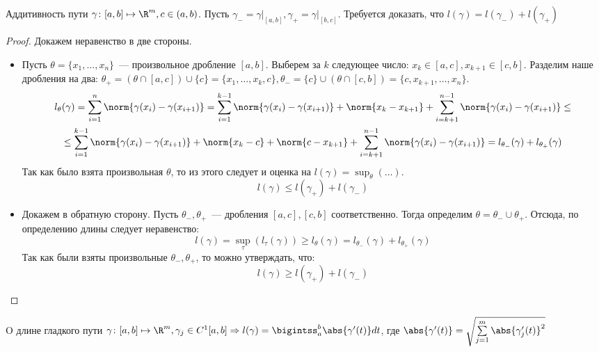 \begin{namedtheorem}{Аддитивность пути}
    $\gamma\colon [a,b]\mapsto\R^m, c\in(a,b)$.
    Пусть $\gamma_{-}=\gamma\big|_{[a,b]}, \gamma_{+} = \gamma\big|_{[b,c]}$.
    Требуется доказать, что $l(\gamma)=l(\gamma_-) + l(\gamma_+)$
\end{namedtheorem}
\begin{proof}
    Докажем неравенство в две стороны.
    \begin{itemize}
        \item
        Пусть $\theta = \{x_1,\dots, x_n\}$~--- произвольное дробление $[a,b]$.
        Выберем за $k$ следующее число: $x_k \in [a,c], x_{k + 1}\in [c,b]$.
        Разделим наше дробления на два:
        $\theta_+ = (\theta \cap [a,c]) \cup \{c\} = \{x_1,\dots,x_k, c\},
        \theta_- = \{c\} \cup (\theta \cap [c, b]) = \{c, x_{k+1},\dots, x_n\}$.
        \[
            \begin{gathered}
                l_{\theta}(\gamma) =
                \sum\limits_{i=1}^{n}\norm{\gamma(x_i) - \gamma(x_{i + 1})}=
                \sum\limits_{i=1}^{k-1}\norm{\gamma(x_i) - \gamma(x_{i + 1})} + \norm{x_k - x_{k+1}} +
                \sum\limits_{i=k+1}^{n-1}\norm{\gamma(x_i) - \gamma(x_{i + 1})}\le\\
                \le\sum\limits_{i=1}^{k-1}\norm{\gamma(x_i) - \gamma(x_{i + 1})}
                + \norm{x_k - c} + \norm{c - x_{k + 1}} +
                \sum\limits_{i=k+1}^{n-1}\norm{\gamma(x_i) - \gamma(x_{i + 1})}=
                l_{\theta_-}(\gamma) + l_{\theta_+}(\gamma)
            \end{gathered}
        \] 
        Так как было взята произвольная $\theta$, то из этого следует и оценка на $l(\gamma) = \sup_\theta(\dots)$.
        \[
            l(\gamma) \le l(\gamma_+) + l(\gamma_-)
        \] 
        \item
        Докажем в обратную сторону.
        Пусть $\theta_-, \theta_+$~--- дробления $[a,c], [c, b]$ соответственно.
        Тогда определим $\theta = \theta_- \cup \theta_+$. Отсюда, по определению длины следует неравенство:
         \[
             l(\gamma) = \sup_{\tau}(l_{\tau}(\gamma)) \ge l_{\theta}(\gamma) = l_{\theta_-}(\gamma) + l_{\theta_+}(\gamma)
        \] 
        Так как были взяты произвольные $\theta_-, \theta_+$, то можно утверждать, что:
         \[
             l(\gamma) \ge l(\gamma_+) + l(\gamma_-)
        \] 
    \end{itemize}
\end{proof}
\begin{namedtheorem}{O длине гладкого пути}
    $\gamma\colon[a,b]\mapsto\R^m, \gamma_j\in C^1[a,b] \Rightarrow 
    l(\gamma)=\bigintss_{a}^{b}\abs{\gamma'(t)}dt$, где
    $\abs{\gamma'(t)} = \sqrt{\sum\limits_{j=1}^{m}{\abs{\gamma'_j(t)}}^2}$
\end{namedtheorem}
